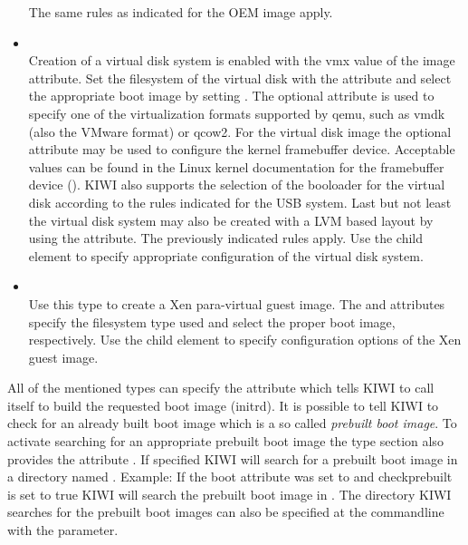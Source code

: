 \begin{itemize}
      The same rules as indicated for the OEM image apply.
\item {}\\
      Creation of a virtual disk system is enabled with the vmx value of
      the image attribute. Set the filesystem of the virtual disk with
      the  attribute and select the appropriate boot
      image by setting . The optional
       attribute is used to specify one of the virtualization
      formats supported by qemu, such as vmdk (also the VMware format) or
      qcow2. For the virtual disk image the optional  attribute
      may be used to configure the kernel framebuffer device. Acceptable
      values can be found in the Linux kernel documentation for the
      framebuffer device (). KIWI also supports
      the selection of the booloader for the virtual disk according to
      the rules indicated for the USB system. Last but not least
      the virtual disk system may also be created with a LVM based layout by
      using the  attribute. The previously indicated rules apply.
      Use the  child element
      to specify appropriate configuration of the virtual disk system.
\item {}\\
      Use this type to create a Xen para-virtual guest image. The
       and  attributes
      specify the filesystem type used and select the proper boot image,
      respectively. Use the  child element to specify
      configuration options of the Xen guest image.
\end{itemize}

All of the mentioned types can specify the  attribute
which tells KIWI to call itself to build the requested boot image (initrd).
It is possible to tell KIWI to check for an already built boot image
which is a so called \emph{prebuilt boot image}. To activate searching
for an appropriate prebuilt boot image the type section also provides the
attribute . If specified KIWI will
search for a prebuilt boot image in a directory named
. Example: If the boot
attribute was set to  and checkprebuilt is set to true
KIWI will search the prebuilt boot image in
. The directory KIWI
searches for the prebuilt boot images can also be specified at the
commandline with the  parameter.

